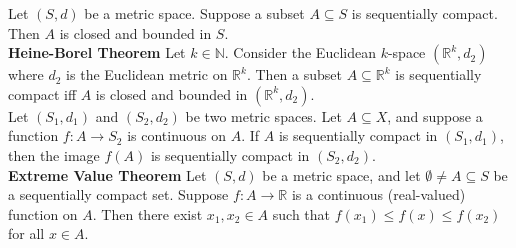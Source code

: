 \documentclass[10pt,landscape]{article}
\begin{document}
\begin{multicols}{3}
Let  $(S,d)$ be a metric space. Suppose a subset  $A\subseteq S$ is sequentially compact. Then  $A$ is closed and bounded in  $S$.\\
\textbf{Heine-Borel Theorem} Let  $k\in\mathbb{N}$. Consider the Euclidean  $k$-space  $(\mathbb{R}^k,d_2)$ where $d_2$ is the Euclidean metric on $\mathbb{R}^k$. Then a subset  $A\subseteq\mathbb{R}^k$ is sequentially compact iff  $A$ is closed and bounded in  $(\mathbb{R}^k,d_2)$.\\
Let $(S_1,d_1)$ and $(S_2,d_2)$ be two metric spaces. Let $A\subseteq X$, and suppose a function  $f:A\to S_2$ is continuous on $A$. If  $A$ is sequentially compact in  $(S_1,d_1)$, then the image $f(A)$ is sequentially compact in  $(S_2,d_2)$.\\
\textbf{Extreme Value Theorem} Let $(S,d)$ be a metric space, and let  $\emptyset\neq A\subseteq S$ be a sequentially compact set. Suppose  $f:A\to\mathbb{R}$ is a continuous (real-valued) function on  $A$. Then there exist  $x_1,x_2\in A$ such that $f(x_1)\leq f(x)\leq f(x_2)$ for all $x\in A$.
\end{multicols}
\end{document}

